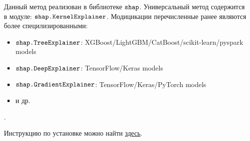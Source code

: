 Данный метод реализован в библиотеке $\verb|shap|$. Универсальный метод содержится в модуле: $\verb|shap.KernelExplainer|$. Модицикации перечисленные ранее являются более специлизированными:\\[-8mm]
\begin{itemize}
	\item $\verb|shap.TreeExplainer|$: XGBoost/LightGBM/CatBoost/scikit-learn/pyspark models\\[-7mm]
	\item $\verb|shap.DeepExplainer|$: TensorFlow/Keras models\\[-7mm]
	\item $\verb|shap.GradientExplainer|$: TensorFlow/Keras/PyTorch models\\[-7mm]
	\item и др.
\end{itemize}.
\vspace{-7mm}

Инструкцию по установке можно найти \href{https://github.com/slundberg/shap}{здесь}.